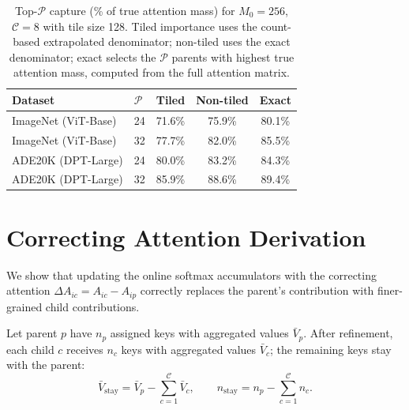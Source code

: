 \begin{table}[h]
\centering
\caption{Top-$\mathcal{P}$ capture (\% of true attention mass) for $M_0{=}256$, $\mathcal{C}{=}8$ with tile size 128. Tiled importance uses the count-based extrapolated denominator; non-tiled uses the exact denominator; exact selects the $\mathcal{P}$ parents with highest true attention mass, computed from the full attention matrix.}
\label{tab:tiled_capture}
\begin{tabular}{llccc}
\toprule
\textbf{Dataset} & $\mathcal{P}$ & \textbf{Tiled} & \textbf{Non-tiled} & \textbf{Exact} \\
\midrule
ImageNet (ViT-Base)   & 24 & 71.6\% & 75.9\% & 80.1\% \\
ImageNet (ViT-Base)   & 32 & 77.7\% & 82.0\% & 85.5\% \\
ADE20K (DPT-Large)    & 24 & 80.0\% & 83.2\% & 84.3\% \\
ADE20K (DPT-Large)    & 32 & 85.9\% & 88.6\% & 89.4\% \\
\bottomrule
\end{tabular}
\end{table}

\section{Correcting Attention Derivation}
\label{app:correcting_attention}

We show that updating the online softmax accumulators with the correcting attention $\Delta A_{ic} = A_{ic} - A_{ip}$ correctly replaces the parent's contribution with finer-grained child contributions.

Let parent $p$ have $n_p$ assigned keys with aggregated values $\bar{V}_p$. After refinement, each child $c$ receives $n_c$ keys with aggregated values $\bar{V}_c$; the remaining keys stay with the parent:
\begin{equation}
\bar{V}_{\text{stay}} = \bar{V}_p - \sum_{c=1}^{\mathcal{C}} \bar{V}_c, \qquad n_{\text{stay}} = n_p - \sum_{c=1}^{\mathcal{C}} n_c.
\end{equation}

